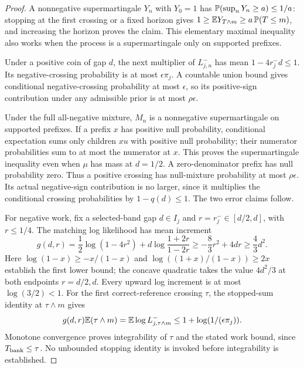 \begin{proof}
A nonnegative supermartingale $Y_n$ with $Y_0=1$ has
$\mathbb P(\sup_nY_n\ge a)\le1/a$: stopping at the first crossing or a fixed
horizon gives $1\ge\mathbb E Y_{T\wedge m}\ge a\,\mathbb P(T\le m)$, and increasing
the horizon proves the claim. This elementary maximal inequality also
works when the process is a supermartingale only on supported prefixes.

Under a positive coin of gap $d$, the next multiplier of $L_{j,n}^-$
has mean $1-4r_j^-d\le1$. Its negative-crossing probability is at most
$\epsilon\pi_j$. A countable union bound gives conditional
negative-crossing probability at most $\epsilon$, so its positive-sign
contribution under any admissible prior is at most $\rho\epsilon$.

Under the full all-negative mixture, $M_n$ is a nonnegative
supermartingale on supported prefixes. If a prefix $x$ has positive
null probability, conditional expectation sums only children $xu$
with positive null probability; their numerator probabilities sum to
at most the numerator at $x$. This proves the supermartingale
inequality even when $\mu$ has mass at $d=1/2$. A zero-denominator prefix
has null probability zero. Thus a positive crossing has null-mixture
probability at most $\rho\epsilon$. Its actual negative-sign
contribution is no larger, since it multiplies the conditional
crossing probabilities by $1-q(d)\le1$. The two error claims follow.

For negative work, fix a selected-band gap $d\in I_j$ and
$r=r_j^-\in[d/2,d]$, with $r\le1/4$. The matching log likelihood has
mean increment
\[
 g(d,r)=\frac12\log(1-4r^2)
          +d\log\frac{1+2r}{1-2r}
 \ge-\frac83r^2+4dr\ge\frac43d^2.
\]
Here $\log(1-x)\ge-x/(1-x)$ and
$\log((1+x)/(1-x))\ge2x$ establish the first lower bound; the
concave quadratic takes the value $4d^2/3$ at both endpoints
$r=d/2,d$. Every upward log increment is at most $\log(3/2)<1$.
For the first correct-reference crossing $\tau$, the stopped-sum
identity at $\tau\wedge m$ gives
\[
 g(d,r)\mathbb E(\tau\wedge m)
 =\mathbb E\log L^-_{j,\tau\wedge m}
 \le1+\log(1/(\epsilon\pi_j)).
\]
Monotone convergence proves integrability of $\tau$ and the stated
work bound, since $T_{\rm bank}\le\tau$. No unbounded stopping identity
is invoked before integrability is established.


\end{proof}
